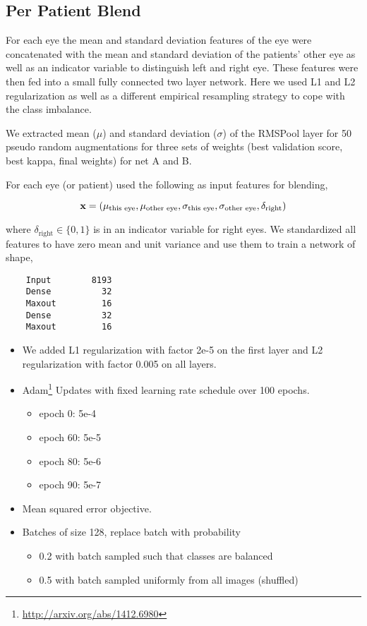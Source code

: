 \documentclass[12pt,a4paper]{scrartcl}
\begin{document}
\subsection{Per Patient Blend}
For each eye the mean and standard deviation features of the eye were concatenated with the mean and standard deviation of the patients' other eye as well as an indicator variable to distinguish left and right eye. These features were then fed into a small fully connected two layer network. Here we used L1 and L2 regularization as well as a different empirical resampling strategy to cope with the class imbalance.


We extracted mean ($\mu$) and standard deviation ($\sigma$) of the RMSPool layer for 50 pseudo random augmentations for three sets of weights (best validation score,
best kappa, final weights) for net A and B.

For each eye (or patient) used the following as input features for
blending,

\[
{\bf x} = (\mu_\textrm{this eye}, \mu_\textrm{other eye}, \sigma_\textrm{this eye}, \sigma_\textrm{other eye}, \delta_\textrm{right})
\]

where $\delta_\textrm{right} \in \{0, 1\}$ is in an indicator variable for right eyes. We standardized all features to have zero mean and unit variance and use them to train a network of shape,

\begin{verbatim}
    Input        8193
    Dense          32
    Maxout         16
    Dense          32
    Maxout         16
\end{verbatim}

\begin{itemize}
\itemsep1pt\parskip0pt
\item We added L1 regularization with factor 2e-5 on the first layer and L2 regularization
  with factor 0.005 on all layers.
\item
  Adam\footnote{\url{http://arxiv.org/abs/1412.6980}} Updates with fixed
  learning rate schedule over 100 epochs.
  \begin{itemize}
\item
  epoch 0: 5e-4
\item
  epoch 60: 5e-5
\item
  epoch 80: 5e-6
\item
  epoch 90: 5e-7
  \end{itemize}
\item
  Mean squared error objective.
\item
  Batches of size 128, replace batch with probability
  \begin{itemize}
\item
  0.2 with batch sampled such that classes are balanced
\item
  0.5 with batch sampled uniformly from all images (shuffled)
 \end{itemize}
\end{itemize}
\end{document}
